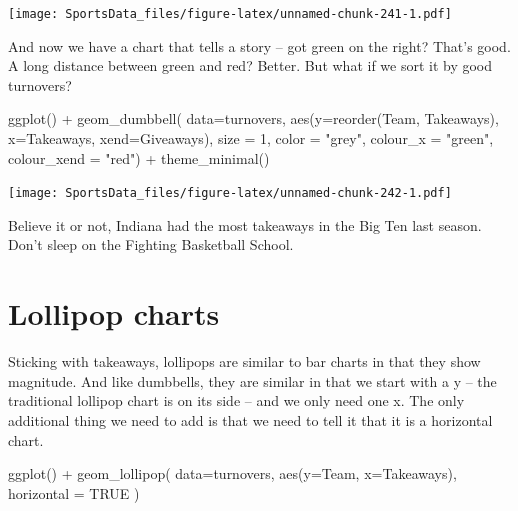 \documentclass[
]{book}
\newenvironment{Shaded}{\begin{snugshade}}{\end{snugshade}}
\newcommand{\AttributeTok}[1]{\textcolor[rgb]{0.77,0.63,0.00}{#1}}
\newcommand{\ConstantTok}[1]{\textcolor[rgb]{0.00,0.00,0.00}{#1}}
\newcommand{\DecValTok}[1]{\textcolor[rgb]{0.00,0.00,0.81}{#1}}
\newcommand{\FunctionTok}[1]{\textcolor[rgb]{0.00,0.00,0.00}{#1}}
\newcommand{\NormalTok}[1]{#1}
\newcommand{\SpecialCharTok}[1]{\textcolor[rgb]{0.00,0.00,0.00}{#1}}
\newcommand{\StringTok}[1]{\textcolor[rgb]{0.31,0.60,0.02}{#1}}
\begin{document}
\texttt{[image: SportsData\_files/figure-latex/unnamed-chunk-241-1.pdf]}

And now we have a chart that tells a story -- got green on the right? That's good. A long distance between green and red? Better. But what if we sort it by good turnovers?

\begin{Shaded}
\begin{Highlighting}[]
\FunctionTok{ggplot}\NormalTok{() }\SpecialCharTok{+} 
  \FunctionTok{geom\_dumbbell}\NormalTok{(}
    \AttributeTok{data=}\NormalTok{turnovers, }
    \FunctionTok{aes}\NormalTok{(}\AttributeTok{y=}\FunctionTok{reorder}\NormalTok{(Team, Takeaways), }\AttributeTok{x=}\NormalTok{Takeaways, }\AttributeTok{xend=}\NormalTok{Giveaways),}
    \AttributeTok{size =} \DecValTok{1}\NormalTok{,}
    \AttributeTok{color =} \StringTok{"grey"}\NormalTok{,}
    \AttributeTok{colour\_x =} \StringTok{"green"}\NormalTok{,}
    \AttributeTok{colour\_xend =} \StringTok{"red"}\NormalTok{) }\SpecialCharTok{+} 
  \FunctionTok{theme\_minimal}\NormalTok{()}
\end{Highlighting}
\end{Shaded}

\texttt{[image: SportsData\_files/figure-latex/unnamed-chunk-242-1.pdf]}

Believe it or not, Indiana had the most takeaways in the Big Ten last season. Don't sleep on the Fighting Basketball School.

\hypertarget{lollipop-charts}{%
\section{Lollipop charts}\label{lollipop-charts}}

Sticking with takeaways, lollipops are similar to bar charts in that they show magnitude. And like dumbbells, they are similar in that we start with a y -- the traditional lollipop chart is on its side -- and we only need one x. The only additional thing we need to add is that we need to tell it that it is a horizontal chart.

\begin{Shaded}
\begin{Highlighting}[]
\FunctionTok{ggplot}\NormalTok{() }\SpecialCharTok{+} 
  \FunctionTok{geom\_lollipop}\NormalTok{(}
    \AttributeTok{data=}\NormalTok{turnovers, }
    \FunctionTok{aes}\NormalTok{(}\AttributeTok{y=}\NormalTok{Team, }\AttributeTok{x=}\NormalTok{Takeaways), }
    \AttributeTok{horizontal =} \ConstantTok{TRUE}
\NormalTok{    )}
\end{Highlighting}
\end{Shaded}
\end{document}
